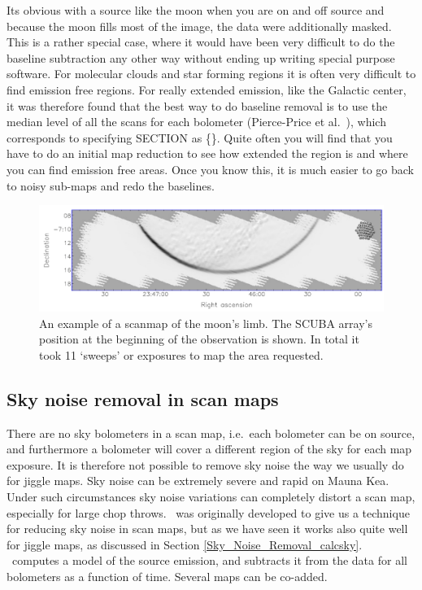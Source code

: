 \documentclass[twoside,11pt,noabs]{starlink}
\providecommand{\task}[1]{\textsf{#1}}
\providecommand{\calcsky}{\xref{\task{calcsky}}{sun216}{CALCSKY}}
\begin{document}
Its obvious with a source like the moon when you are on and off source
and because the moon fills most of the image, the data were
additionally masked.  This is a rather special case, where it would
have been very difficult to do the baseline subtraction any other way
without ending up writing special purpose software.  For molecular
clouds and star forming regions it is often very difficult to find
emission free regions.  For really extended emission, like the
Galactic center, it was therefore found that the best way to do
baseline removal is to use the median level of all the scans for each
bolometer (Pierce-Price et al.\  \cite{Pierce00}), which corresponds to
specifying SECTION as \{\}.  Quite often you will find that you have to
do an initial map reduction to see how extended the region is and
where you can find emission free areas.  Once you know this, it is
much easier to go back to noisy sub-maps and redo the baselines.


\begin{figure}
\begin{center}
\includegraphics[width=\textwidth]{sc11_fig8}
\caption[An example scanmap of the moon's limb.]{An example of a scanmap of the moon's limb. The SCUBA
array's position at the beginning of the observation is shown.  In
total it took 11 `sweeps' or exposures to map the area requested.}

\label{fig:moon}
\end{center}
\end{figure}

\subsection{Sky noise removal in scan maps
\label{scan_maps_calcsky}}

There are no sky bolometers in a scan map, i.e.\ each bolometer can be
on source, and furthermore a bolometer will cover a different region
of the sky for each map exposure.  It is therefore not possible to
remove sky noise the way we usually do for jiggle maps.  Sky noise can
be extremely severe and rapid on Mauna Kea.  Under such circumstances
sky noise variations can completely distort a scan map, especially for
large chop throws.  \calcsky\ was originally developed to give us a
technique for reducing sky noise in scan maps, but as we have seen it
works also quite well for jiggle maps, as discussed in Section
\ref{Sky_Noise_Removal_calcsky}.  \calcsky\ computes a model of the
source emission, and subtracts it from the data for all bolometers as
a function of time. Several maps can be co-added.
\end{document}
